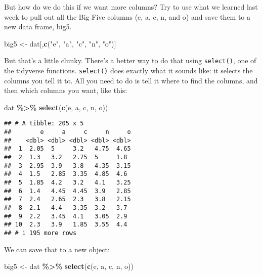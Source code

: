 \documentclass[
]{article}
\newenvironment{Shaded}{\begin{snugshade}}{\end{snugshade}}
\newcommand{\FunctionTok}[1]{\textcolor[rgb]{0.13,0.29,0.53}{\textbf{#1}}}
\newcommand{\NormalTok}[1]{#1}
\newcommand{\OtherTok}[1]{\textcolor[rgb]{0.56,0.35,0.01}{#1}}
\newcommand{\SpecialCharTok}[1]{\textcolor[rgb]{0.81,0.36,0.00}{\textbf{#1}}}
\newcommand{\StringTok}[1]{\textcolor[rgb]{0.31,0.60,0.02}{#1}}
\begin{document}
But how do we do this if we want more columns? Try to use what we
learned last week to pull out all the Big Five columns (e, a, c, n, and
o) and save them to a new data frame, big5.

\begin{Shaded}
\begin{Highlighting}[]
\NormalTok{big5 }\OtherTok{\textless{}{-}}\NormalTok{ dat[,}\FunctionTok{c}\NormalTok{(}\StringTok{"e"}\NormalTok{, }\StringTok{"a"}\NormalTok{, }\StringTok{"c"}\NormalTok{, }\StringTok{"n"}\NormalTok{, }\StringTok{"o"}\NormalTok{)]}
\end{Highlighting}
\end{Shaded}

But that's a little clunky. There's a better way to do that using
\texttt{select()}, one of the tidyverse functions. \texttt{select()}
does exactly what it sounds like: it selects the columns you tell it to.
All you need to do is tell it where to find the columns, and then which
columns you want, like this:

\begin{Shaded}
\begin{Highlighting}[]
\NormalTok{dat }\SpecialCharTok{\%\textgreater{}\%} 
  \FunctionTok{select}\NormalTok{(}\FunctionTok{c}\NormalTok{(e, a, c, n, o))}
\end{Highlighting}
\end{Shaded}

\begin{verbatim}
## # A tibble: 205 x 5
##        e     a     c     n     o
##    <dbl> <dbl> <dbl> <dbl> <dbl>
##  1  2.05  5     3.2   4.75  4.65
##  2  1.3   3.2   2.75  5     1.8 
##  3  2.95  3.9   3.8   4.35  3.15
##  4  1.5   2.85  3.35  4.85  4.6 
##  5  1.85  4.2   3.2   4.1   3.25
##  6  1.4   4.45  4.45  3.9   2.85
##  7  2.4   2.65  2.3   3.8   2.15
##  8  2.1   4.4   3.35  3.2   3.7 
##  9  2.2   3.45  4.1   3.05  2.9 
## 10  2.3   3.9   1.85  3.55  4.4 
## # i 195 more rows
\end{verbatim}

We can save that to a new object:

\begin{Shaded}
\begin{Highlighting}[]
\NormalTok{big5 }\OtherTok{\textless{}{-}}\NormalTok{ dat }\SpecialCharTok{\%\textgreater{}\%} 
  \FunctionTok{select}\NormalTok{(}\FunctionTok{c}\NormalTok{(e, a, c, n, o))}
\end{Highlighting}
\end{Shaded}
\end{document}
